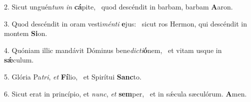 2. Sicut unguén\textit{tum} \textit{in} \textbf{cá}pite, \ast\  quod descéndit in barbam, barbam \textbf{A}aron.\

3. Quod descéndit in oram vesti\textit{mén}\textit{ti} \textbf{e}jus: \ast\  sicut ros Hermon, qui descéndit in montem \textbf{Si}on.\

4. Quóniam illic mandávit Dóminus bene\textit{dic}\textit{ti}\textbf{ó}nem, \ast\  et vitam usque in \textbf{sǽ}culum.\

5. Glória Pa\textit{tri}, \textit{et} \textbf{Fí}lio, \ast\  et Spirítui \textbf{Sanc}to.\

6. Sicut erat in princípio, et \textit{nunc}, \textit{et} \textbf{sem}per, \ast\  et in sǽcula sæculórum. \textbf{A}men.\


